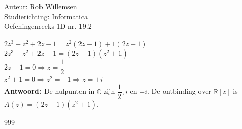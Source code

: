 \documentclass[a4paper]{article}
\begin{document}
\noindent \large Auteur: Rob Willemsen \\
\noindent \large Studierichting: Informatica\\
\noindent \large Oefeningenreeks 1D nr. 19.2\\

\medskip

\normalsize

$2z^3 - z^2 + 2z - 1 = z^2(2z - 1) + 1(2z - 1)$ \\

$2z^3 - z^2 + 2z - 1 = (2z - 1)(z^2 + 1)$ \\

$2z - 1 = 0 \Rightarrow z = \dfrac{1}{2}$ \\

$z^2 + 1 = 0 \Rightarrow z^2 = -1 \Rightarrow z = \pm i$ \\

\textbf{Antwoord:} De nulpunten in $\mathbb{C}$ zijn $\dfrac{1}{2}, i$ en $-i$. De ontbinding over $\mathbb{R}[z]$ is $A(z) = (2z - 1)(z^2 + 1)$. \\

\begin{thebibliography}{999}
\end{thebibliography}
\end{document}
